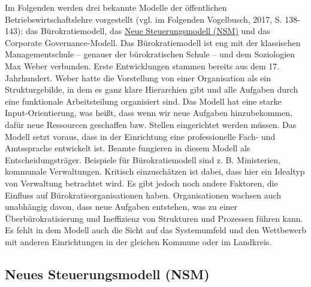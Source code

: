 \documentclass[
  letterpaper,
]{book}
\begin{document}
Im Folgenden werden drei bekannte Modelle der öffentlichen
Betriebswirtschaftslehre vorgestellt (vgl. im Folgenden Vogelbusch,
2017, S. 138-143): das Bürokratiemodell, das
\href{https://wirtschaftslexikon.gabler.de/definition/neues-steuerungsmodell-nsm-41327}{Neue
Steuerungsmodell (NSM)} und das Corporate Governance-Modell. Das
Bürokratiemodell ist eng mit der klassischen Managementschule -- genauer
der bürokratischen Schule -- und dem Soziologien Max Weber verbunden.
Erste Entwicklungen stammen bereits aus dem 17. Jahrhundert. Weber hatte
die Vorstellung von einer Organisation als ein Strukturgebilde, in dem
es ganz klare Hierarchien gibt und alle Aufgaben durch eine funktionale
Arbeitsteilung organisiert sind. Das Modell hat eine starke
Input-Orientierung, was heißt, dass wenn wir neue Aufgaben
hinzubekommen, dafür neue Ressourcen geschaffen bzw. Stellen
eingerichtet werden müssen. Das Modell setzt voraus, dass in der
Einrichtung eine professionelle Fach- und Amtssprache entwickelt ist.
Beamte fungieren in diesem Modell als Entscheidungsträger. Beispiele für
Bürokratiemodell sind z. B. Ministerien, kommunale Verwaltungen.
Kritisch einzuschätzen ist dabei, dass hier ein Idealtyp von Verwaltung
betrachtet wird. Es gibt jedoch noch andere Faktoren, die Einfluss auf
Bürokratieorganisationen haben. Organisationen wachsen auch unabhängig
davon, dass neue Aufgaben entstehen, was zu einer Überbürokratisierung
und Ineffizienz von Strukturen und Prozessen führen kann. Es fehlt in
dem Modell auch die Sicht auf das Systemumfeld und den Wettbewerb mit
anderen Einrichtungen in der gleichen Kommune oder im Landkreis.

\subsection{Neues Steuerungsmodell
(NSM)}\label{neues-steuerungsmodell-nsm}
\end{document}
